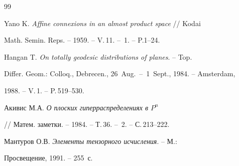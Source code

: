 \begin{thebibliography}{99}


Yano K. {\em Affine connexions in an almost product space} // Kodai 


Math. Semin. Reps. -- 1959. -- V.\,11. -- \No\,1. -- P.1--24. 




Hangan T. {\em On totally geodesic distributions of planes}. -- Top. 


Differ. Geom.: Colloq., Debrecen., 26~Aug.~--~1~Sept., 1984. -- Amsterdam, 


1988. -- V.\,1. -- P.\,519--530. 




Акивис М.А. {\em О плоских гиперраспределениях в $P^n$} 


// Матем. заметки. -- 1984. -- Т.\,36. -- \No\,2. -- С.\,213--222. 




Мантуров О.В. {\em Элементы тензорного исчисления}. -- М.:


Просвещение, 1991. -- 255~с.


 


\end{thebibliography} 


 


\vskip 2cm 


 






 


\label{end} 


 


 


